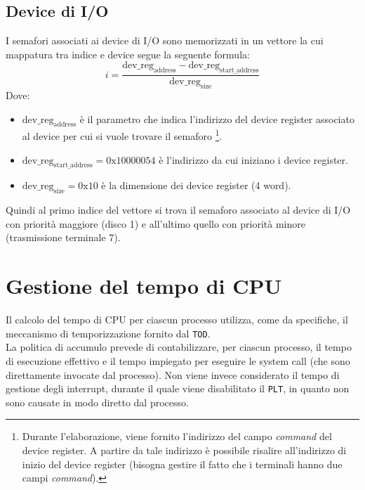 \documentclass[11pt]{article}
\begin{document}
\subsection{Device di I/O}
I semafori associati ai device di I/O sono memorizzati in un vettore la cui mappatura tra indice e device segue la seguente formula:
\begin{equation}
    i = \dfrac{\text{dev\_reg}_{\text{address}} - \text{dev\_reg}_{\text{start\_address}}}{\text{dev\_reg}_{\text{size}}} 
\end{equation}
Dove:
\begin{itemize}
    \item $\text{dev\_reg}_{\text{address}}$ è il parametro che indica l'indirizzo del device register associato al device per cui si vuole trovare il semaforo
            \footnote{Durante l'elaborazione, viene fornito l'indirizzo del campo \textit{command} del device register. A partire da tale indirizzo è possibile risalire all'indirizzo di inizio del device register (bisogna gestire il fatto che i terminali hanno due campi \textit{command}).}.
    \item $\text{dev\_reg}_{\text{start\_address}}=0\text{x}10000054$ è l'indirizzo da cui iniziano i device register.
    \item $\text{dev\_reg}_{\text{size}}=0\text{x}10$ è la dimensione dei device register (4 word).
\end{itemize}
Quindi al primo indice del vettore si trova il semaforo associato al device di I/O con priorità maggiore (disco 1) e all'ultimo quello con priorità minore (trasmissione terminale 7).


\section{Gestione del tempo di CPU}
Il calcolo del tempo di CPU per ciascun processo utilizza, come da specifiche, il meccanismo di temporizzazione fornito dal \texttt{TOD}.\\
La politica di accumulo prevede di contabilizzare, per ciascun processo, il tempo di esecuzione effettivo e il tempo impiegato per eseguire le system call (che sono direttamente invocate dal processo).
Non viene invece considerato il tempo di gestione degli interrupt, durante il quale viene disabilitato il \texttt{PLT}, in quanto non sono causate in modo diretto dal processo.

\newpage
\end{document}
